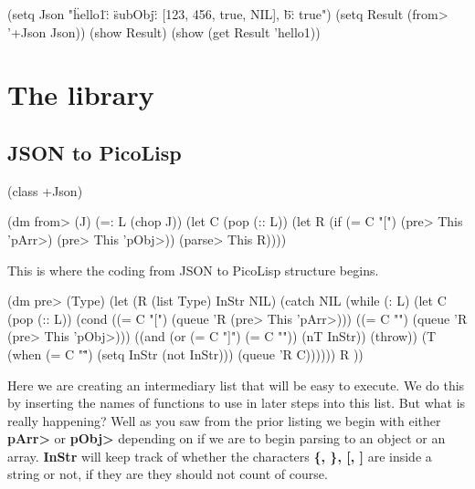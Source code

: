 \begin{wideverbatim}
(setq Json "{\"hello1\": {\"subObj\": [123, 456, true, NIL]}, \"b\": true}")
(setq Result (from> '+Json Json))
(show Result)
(show (get Result 'hello1))
\end{wideverbatim}



\section{The library}
\label{sec:pl-json-the-library}


\subsection{JSON to PicoLisp}
\label{sec:pl-json-json-to-picolisp}



\begin{wideverbatim}
(class +Json)

(dm from> (J)
  (=: L (chop J))
  (let C (pop (:: L))
     (let R (if (= C "[") (pre> This 'pArr>) (pre> This 'pObj>))        
        (parse> This R))))
\end{wideverbatim}

This is where the coding from JSON to PicoLisp structure begins.


\begin{wideverbatim}
(dm pre> (Type)
  (let (R (list Type) InStr NIL)
     (catch NIL 
        (while (: L)
           (let C (pop (:: L))
              (cond
                 ((= C "[") (queue 'R (pre> This 'pArr>)))
                 ((= C "{") (queue 'R (pre> This 'pObj>)))
                 ((and (or (= C "]") (= C "}")) (nT InStr)) (throw))
                 (T (when (= C "\"") 
                          (setq InStr (not InStr))) 
                       (queue 'R C)))))) R ))
\end{wideverbatim}

Here we are creating an intermediary list that will be easy to
execute. We do this by inserting the names of functions to use in
later steps into this list. But what is really happening? Well as you
saw from the prior listing we begin with either
\textbf{pArr\textgreater{}} or \textbf{pObj\textgreater{}} depending
on if we are to begin parsing to an object or an array. \textbf{InStr}
will keep track of whether the characters \textbf{\{, \}, [, ]} are
inside a string or not, if they are they should not count of course.

